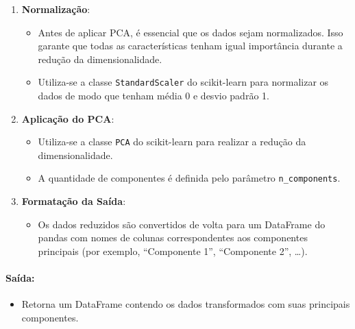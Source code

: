 \documentclass[11pt]{article}
\providecommand{\tightlist}{%
      \setlength{\itemsep}{0pt}\setlength{\parskip}{0pt}}
\begin{document}
\begin{enumerate}
\def\labelenumi{\arabic{enumi}.}
\tightlist
\item
  \textbf{Normalização}:

  \begin{itemize}
  \tightlist
  \item
    Antes de aplicar PCA, é essencial que os dados sejam normalizados.
    Isso garante que todas as características tenham igual importância
    durante a redução da dimensionalidade.
  \item
    Utiliza-se a classe \texttt{StandardScaler} do scikit-learn para
    normalizar os dados de modo que tenham média 0 e desvio padrão 1.
  \end{itemize}
\item
  \textbf{Aplicação do PCA}:

  \begin{itemize}
  \tightlist
  \item
    Utiliza-se a classe \texttt{PCA} do scikit-learn para realizar a
    redução da dimensionalidade.
  \item
    A quantidade de componentes é definida pelo parâmetro
    \texttt{n\_components}.
  \end{itemize}
\item
  \textbf{Formatação da Saída}:

  \begin{itemize}
  \tightlist
  \item
    Os dados reduzidos são convertidos de volta para um DataFrame do
    pandas com nomes de colunas correspondentes aos componentes
    principais (por exemplo, ``Componente 1'', ``Componente 2'',
    \ldots{}).
  \end{itemize}
\end{enumerate}

\hypertarget{sauxedda}{%
\paragraph{\texorpdfstring{\textbf{Saída:}}{Saída:}}\label{sauxedda}}

\begin{itemize}
\tightlist
\item
  Retorna um DataFrame contendo os dados transformados com suas
  principais componentes.
\end{itemize}
\end{document}
